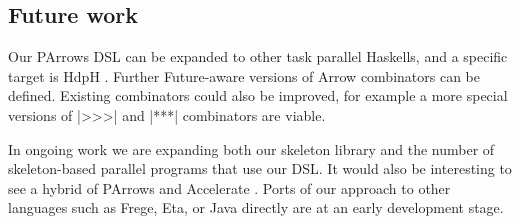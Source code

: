 

\subsection{Future work}
\label{sec:future-work}

Our PArrows DSL can be expanded %
to other task parallel Haskells, and a specific target is HdpH \cite{Maier:2014:HDS:2775050.2633363}.
Further Future-aware versions of Arrow combinators can be defined. Existing combinators could also be improved, for example a more special versions of |>>>| and |***| combinators are viable.

In ongoing work we are expanding 
both our skeleton library and the number of skeleton-based parallel programs that use our DSL.
It would also be interesting to see a hybrid of PArrows and Accelerate \cite{McDonell:2015:TRC:2887747.2804313}.
Ports of our approach to other languages such as Frege, Eta, or Java directly are at an early development stage.
